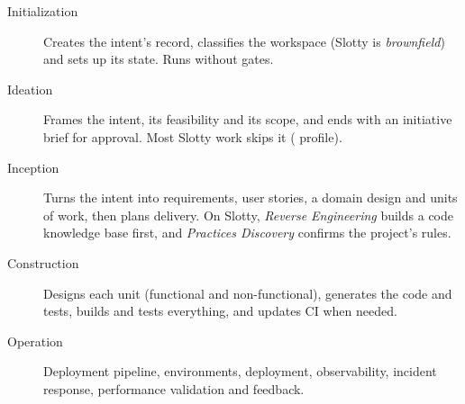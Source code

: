 \begin{description}
  \item[Initialization] Creates the intent's record, classifies the workspace (Slotty is
    \emph{brownfield}) and sets up its state. Runs without gates.
  \item[Ideation] Frames the intent, its feasibility and its scope, and ends with an initiative
    brief for approval. Most Slotty work skips it ( profile).
  \item[Inception] Turns the intent into requirements, user stories, a domain design and units
    of work, then plans delivery. On Slotty, \emph{Reverse Engineering} builds a code knowledge
    base first, and \emph{Practices Discovery} confirms the project's rules.
  \item[Construction] Designs each unit (functional and non-functional), generates the code and
    tests, builds and tests everything, and updates CI when needed.
  \item[Operation] Deployment pipeline, environments, deployment, observability, incident
    response, performance validation and feedback.
\end{description}

